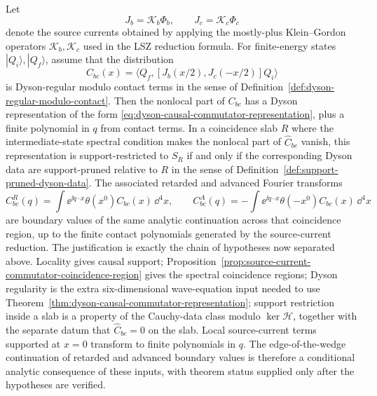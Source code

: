 \begin{remark}
\label{rem:jld-input-for-lsz-retarded-commutator}
Let
\[
  J_b=\mathcal K_b\Phi_b,\qquad J_c=\mathcal K_c\Phi_c
\]
denote the source currents obtained by applying the mostly-plus
Klein--Gordon operators \(\mathcal K_b,\mathcal K_c\) used in the LSZ
reduction formula.  For finite-energy states \(|Q_i\rangle,|Q_f\rangle\),
assume that the distribution
\[
  C_{bc}(x)
  =
  \langle Q_f,[J_b(x/2),J_c(-x/2)]Q_i\rangle
\]
is Dyson-regular modulo contact terms in the sense of
Definition~\ref{def:dyson-regular-modulo-contact}.  Then the nonlocal part of
\(C_{bc}\) has a Dyson representation of the form
\eqref{eq:dyson-causal-commutator-representation}, plus a finite polynomial in
\(q\) from contact terms.  In a coincidence slab \(R\) where the
intermediate-state spectral condition makes the nonlocal part of
\(\widehat C_{bc}\) vanish, this representation is support-restricted to
\(S_R\) if and only if the corresponding Dyson data are support-pruned
relative to \(R\) in the sense of
Definition~\ref{def:support-pruned-dyson-data}.  The associated retarded and
advanced Fourier
transforms
\[
  C^R_{bc}(q)=\int\ee^{\ii q\cdot x}\theta(x^0)C_{bc}(x)\,\dd^4x,
  \qquad
  C^A_{bc}(q)=-\int\ee^{\ii q\cdot x}\theta(-x^0)C_{bc}(x)\,\dd^4x
\]
are boundary values of the same analytic continuation across that
coincidence region, up to the finite contact polynomials generated by the
source-current reduction.
The justification is exactly the chain of hypotheses now separated above.
Locality gives causal support; Proposition~\ref{prop:source-current-commutator-coincidence-region}
gives the spectral coincidence regions; Dyson regularity is the extra
six-dimensional wave-equation input needed to use
Theorem~\ref{thm:dyson-causal-commutator-representation}; support restriction
inside a slab is a property of the Cauchy-data class modulo
\(\ker\mathcal H\), together with the separate datum that
\(\widehat C_{bc}=0\) on the slab.  Local source-current terms supported at
\(x=0\) transform to finite
polynomials in \(q\).  The edge-of-the-wedge continuation of retarded and
advanced boundary values is therefore a conditional analytic consequence of
these inputs, with theorem status supplied only after the hypotheses are
verified.
\end{remark}

